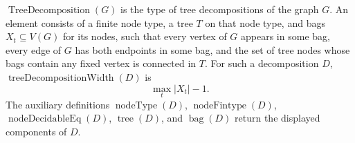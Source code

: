 \(\operatorname{TreeDecomposition}(G)\) is the type of tree decompositions of
the graph \(G\).  An element consists of a finite node type, a tree \(T\) on
that node type, and bags \(X_t\subseteq V(G)\) for its nodes, such that every
vertex of \(G\) appears in some bag, every edge of \(G\) has both endpoints in
some bag, and the set of tree nodes whose bags contain any fixed vertex is
connected in \(T\).  For such a decomposition \(D\),
\(\operatorname{treeDecompositionWidth}(D)\) is
\[
  \max_t |X_t|-1 .
\]
The auxiliary definitions \(\operatorname{nodeType}(D)\),
\(\operatorname{nodeFintype}(D)\), \(\operatorname{nodeDecidableEq}(D)\),
\(\operatorname{tree}(D)\), and \(\operatorname{bag}(D)\) return the displayed
components of \(D\).
